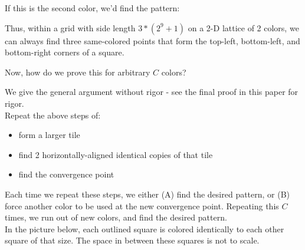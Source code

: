 \documentclass[11pt]{article}
\edef\getxnow(#1,#2){#1}
\edef\getynow(#1,#2){#2}
\newcommand*{\getx}[1]{\expandafter\getxnow#1}
\newcommand*{\gety}[1]{\expandafter\getynow#1}
\newcommand*{\scalePic}{0.4}
\newcommand*{\gridArg}[7]{%
    \foreach \x in {\fpeval{#1},\fpeval{#1+#2},...,\fpeval{#3+0.0001}} %
        \draw [black, thin, #7] (\x,\fpeval{#4}) -- (\x,\fpeval{#6+0.0001});
    \foreach \y in {\fpeval{#4},\fpeval{#4+#5},...,\fpeval{#6+0.0001}}
        \draw [black, thin, #7] (\fpeval{#1},\y) -- (\fpeval{#3+0.0001},\y);
}
\newcommand*{\grid}[6]{\gridArg{#1}{#2}{#3}{#4}{#5}{#6}{}}%
\newcommand*{\mybigbox}[4]{\grid{#1}{#3}{#1+#3}{#2}{#4}{#2+#4}} %
\newcommand*{\mybox}[2]{\mybigbox{#1}{#2}{1}{1}} %
\newcommand*{\myboxes}[1]{\foreach \pt in {#1} {\mybox{\getx{\pt}}{\gety{\pt}}}}
\newcommand{\echoWithinShell}[1]{ ( echo \\\\\\\\begin\\{lstlisting\\}\\[breaklines\\] && echo #1 && echo \\\\\\\\end\\{lstlisting\\} ) }
\newcommand{\shellRun}[2] {%
   && \echoWithinShell{\\ #1} && \echoWithinShell{\\ $OUTPUT} ) }%
}
\newcommand{\cppRun}[2]{%
  \shellRun{#1 #2}{run}
}
\begin{document}
\begin{samepage}
If this is the second color, we'd find the pattern:
\begin{center}
\end{center}
\end{samepage}

Thus, within a grid with side length $3*(2^9+1)$ on a 2-D lattice of 2 colors, we can always find three same-colored points that form the top-left, bottom-left, and bottom-right corners of a square.

Now, how do we prove this for arbitrary $C$ colors?

We give the general argument without rigor - see the final proof in this paper for rigor.\\
Repeat the above steps of:
\begin{itemize}
\item form a larger tile
\item find 2 horizontally-aligned identical copies of that tile
\item find the convergence point
\end{itemize}

Each time we repeat these steps, we either (A) find the desired pattern, or (B) force another color to be used at the new convergence point. Repeating this $C$ times, we run out of new colors, and find the desired pattern.\\
In the picture below, each outlined square is colored identically to each other square of that size. The space in between these squares is not to scale.
\begin{center}
\end{center}
\end{document}
